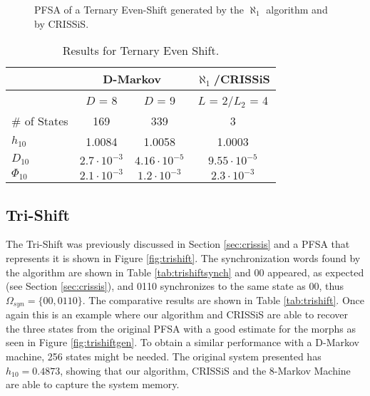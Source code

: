 {\begin{figure}
\centering
{}
\caption{PFSA of a Ternary Even-Shift generated by the $\aleph_1$ algorithm and by CRISSiS.\label{fig:ternaryevengen}}
\end{figure}

\begin{table}
\centering
\caption{Results for Ternary Even Shift. \label{tab:ternaryeven}}
\begin{tabular}{|l|c|c|c|}
\hline
 & \multicolumn{2}{c|}{D-Markov} & $\aleph_1$/CRISSiS\\
 \hline
 & $D$ = 8 & $D$ = 9 &  $L$ = 2/$L_2$ = 4 \\
\hline
\# of States & 169 & 339 & 3 \\ 
$h_{10}$ & 1.0084 & 1.0058 & 1.0003 \\
$D_{10}$ & $2.7\cdot10^{-3}$ & $4.16\cdot10^{-5}$ & $9.55\cdot10^{-5}$ \\
$\Phi_{10}$  & $2.1\cdot10^{-3}$ & $1.2\cdot10^{-3}$ & $2.3\cdot10^{-3}$ \\
 \hline
\end{tabular}
\end{table}

\subsection{Tri-Shift}

The Tri-Shift was previously discussed in Section \ref{sec:crissis} and a PFSA that represents it is shown in Figure \ref{fig:trishift}. The synchronization words found by the algorithm are shown in Table \ref{tab:trishiftsynch} and 00 appeared, as expected (see Section \ref{sec:crissis}), and 0110 synchronizes to the same state as 00, thus $\Omega_{syn} = \{00, 0110\}$. The comparative results are shown in Table \ref{tab:trishift}. Once again this is an example where our algorithm and CRISSiS are able to recover the three states from the original PFSA with a good estimate for the morphs as seen in Figure \ref{fig:trishiftgen}. To obtain a similar performance with a D-Markov machine, 256 states might be needed. The original system presented has $h_{10} = 0.4873$, showing that our algorithm, CRISSiS and the 8-Markov Machine are able to capture the system memory.

}
